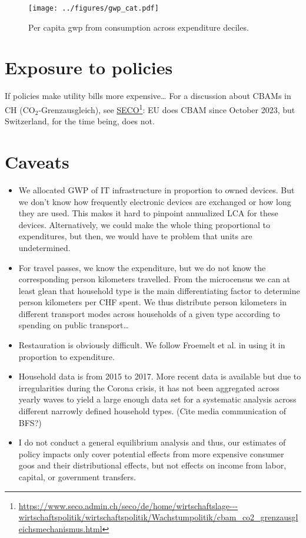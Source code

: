 \documentclass[a4paper,11pt]{article}
\begin{document}
\begin{figure}[htp]
  \centering
  \texttt{[image: ../figures/gwp\_cat.pdf]}
  \caption[\ac{gwp} per decile]{
    Per capita \ac{gwp} from consumption across expenditure deciles.
  }
  \label{fig:gwp_cat}
\end{figure}

\section{Exposure to policies}
\label{policies}
If policies make utility bills more expensive\ldots
For a discussion about CBAMs in CH (CO$_2$-Grenzausgleich), see \href{https://www.seco.admin.ch/seco/de/home/wirtschaftslage---wirtschaftspolitik/wirtschaftspolitik/Wachstumpolitik/cbam_co2_grenzausgleichsmechanismus.html}{SECO}\footnote{
  \url{https://www.seco.admin.ch/seco/de/home/wirtschaftslage---wirtschaftspolitik/wirtschaftspolitik/Wachstumpolitik/cbam_co2_grenzausgleichsmechanismus.html}
}:
EU does CBAM since October 2023, but Switzerland, for the time being, does not.

\section{Caveats}
\label{sec:caveats}

\begin{itemize}
\item We allocated GWP of IT infrastructure in proportion to owned devices.
  But we don't know how frequently electronic devices are exchanged or how long they are used.
This makes it hard to pinpoint annualized LCA for these devices.
Alternatively, we could make the whole thing proportional to expenditures, but then, we would have te problem that units are undetermined.
\item For travel passes, we know the expenditure, but we do not know the corresponding person kilometers travelled.
  From the microcensus we can at least glean that household type is the main differentiating factor to determine person kilometers per CHF spent.
  We thus distribute person kilometers in different transport modes across households of a given type according to spending on public transport\ldots
\item Restauration is obviously difficult.
  We follow Froemelt et al. in using it in proportion to expenditure.
\item Household data is from 2015 to 2017.
  More recent data is available but due to irregularities during the Corona crisis, it has not been aggregated across yearly waves to yield a large enough data set for a systematic analysis across different narrowly defined household types.
  (Cite media communication of BFS?)
\item I do not conduct a general equilibrium analysis and thus, our estimates of policy impacts only cover potential effects from more expensive consumer goos and their distributional effects, but not effects on income from labor, capital, or government transfers.
\end{itemize}
\end{document}
